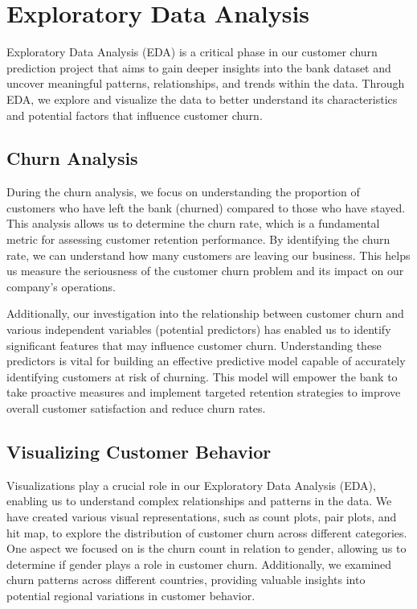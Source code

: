\documentclass[11pt,a4paper]{article}
\begin{document}
\section{Exploratory Data Analysis}

Exploratory Data Analysis (EDA) is a critical phase in our customer churn prediction project that aims to gain deeper insights into the bank dataset and uncover meaningful patterns, relationships, and trends within the data. Through EDA, we explore and visualize the data to better understand its characteristics and potential factors that influence customer churn.

\subsection{Churn Analysis}

During the churn analysis, we focus on understanding the proportion of customers who have left the bank (churned) compared to those who have stayed. This analysis allows us to determine the churn rate, which is a fundamental metric for assessing customer retention performance. By identifying the churn rate, we can understand how many customers are leaving our business. This helps us measure the seriousness of the customer churn problem and its impact on our company's operations.

Additionally, our investigation into the relationship between customer churn and various independent variables (potential predictors) has enabled us to identify significant features that may influence customer churn. Understanding these predictors is vital for building an effective predictive model capable of accurately identifying customers at risk of churning. This model will empower the bank to take proactive measures and implement targeted retention strategies to improve overall customer satisfaction and reduce churn rates.

\subsection{Visualizing Customer Behavior}

Visualizations play a crucial role in our Exploratory Data Analysis (EDA), enabling us to understand complex relationships and patterns in the data. We have created various visual representations, such as count plots, pair plots, and hit map,  to explore the distribution of customer churn across different categories. One aspect we focused on is the churn count in relation to gender, allowing us to determine if gender plays a role in customer churn. Additionally, we examined churn patterns across different countries, providing valuable insights into potential regional variations in customer behavior.
\end{document}
